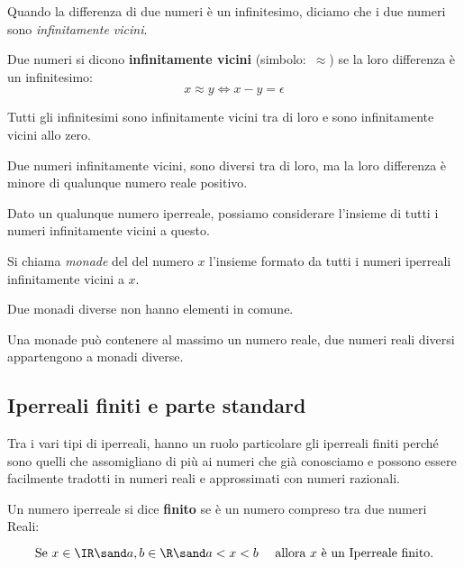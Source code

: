 Quando la differenza di due numeri è un infinitesimo, diciamo 
che i due numeri sono \emph{infinitamente vicini}.

\begin{definizione}    %
Due numeri si dicono \textbf{infinitamente vicini} (simbolo:~\(\approx\)) se 
la loro differenza è un infinitesimo:
\[x \approx y \Leftrightarrow x - y = \epsilon\]
\end{definizione}

Tutti gli infinitesimi sono infinitamente vicini tra di loro e sono 
infinitamente vicini allo zero.

Due numeri infinitamente vicini, sono diversi tra di loro, ma la loro 
differenza è minore di qualunque numero reale positivo.

Dato un qualunque numero iperreale, possiamo considerare l'insieme di tutti 
i numeri infinitamente vicini a questo. 

\begin{definizione}
 Si chiama \emph{monade} del del numero \(x\) l'insieme formato da tutti i 
numeri iperreali infinitamente vicini a \(x\).
\end{definizione}

Due monadi diverse non hanno elementi in comune.

Una monade può contenere al massimo un numero reale, due numeri reali 
diversi appartengono a monadi diverse.

\subsection{Iperreali finiti e parte standard}
\label{subsec:insnum_partestandard}

Tra i vari tipi di iperreali, hanno un ruolo particolare gli iperreali 
finiti perché sono quelli che assomigliano di più ai numeri che già 
conosciamo e possono essere facilmente tradotti in numeri reali e 
approssimati con numeri razionali. 

\begin{definizione}
 Un numero iperreale si dice \textbf{finito} se è un numero compreso tra 
due numeri Reali:

\[\text{Se } x \in \IR \sand a, b \in \R \sand 
  a < x < b \quad \text{ allora } x \text{ è un Iperreale finito.}\]
\end{definizione}


